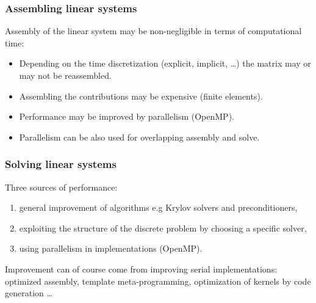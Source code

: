 \begin{frame}
  \frametitle{Assembling linear systems}

Assembly of the linear system may be non-negligible in terms of computational time:
\begin{itemize}
\item Depending on the time discretization (explicit, implicit, \dots) the matrix may or may not be reassembled.
\item Assembling the contributions may be expensive (finite elements).
\item Performance may be improved by parallelism (OpenMP).
\item Parallelism can be also used for overlapping assembly and solve.
\end{itemize}


\end{frame}

\begin{frame}
  \frametitle{Solving linear systems}

Three sources of performance:
\begin{enumerate}
\item general improvement of algorithms e.g Krylov solvers and preconditioners,
\item exploiting the structure of the discrete problem by choosing a specific solver,
\item using parallelism in implementations (OpenMP).
\end{enumerate}

\bigskip
Improvement can of course come from improving serial implementations: optimized assembly, template meta-programming, optimization of kernels by code generation \dots

\end{frame}


